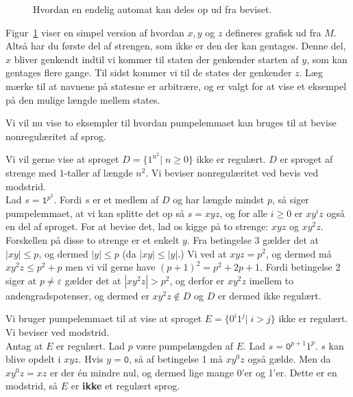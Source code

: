 \begin{figure}[ht]
  \centering
  \caption{\label{fig:pumpelemma} Hvordan en endelig automat kan deles op ud fra beviset.}
\end{figure}


Figur~\ref{fig:pumpelemma} viser en simpel version af hvordan $x, y$ og $z$ defineres grafisk ud fra $M$. Altså har du første del af strengen, som ikke er den der kan gentages. Denne del, $x$ bliver genkendt indtil vi kommer til staten der genkender starten af $y$, som kan gentages flere gange. Til sidst kommer vi til de states der genkender $z$. Læg mærke til at navnene på statesne er arbitrære, og er valgt for at vise et eksempel på den mulige længde mellem states.


Vi vil nu vise to eksempler til hvordan pumpelemmaet kan bruges til at bevise nonregulæritet af sprog.

\begin{example}
  Vi vil gerne vise at sproget $D = \{1^{n^{2}}|\; n \geq 0\}$ ikke er regulært. $D$ er sproget af strenge med $1$-taller af længde $n^{2}$. Vi beviser nonregulæritet ved bevis ved modstrid.\\
  Lad $s = \mathtt{1}^{p^{2}}$. Fordi $s$ er et medlem af $D$ og har længde mindst $p$, så siger pumpelemmaet, at vi kan splitte det op så $s = xyz$, og for alle $i \geq 0$ er $xy^{i}z$ også en del af sproget. For at bevise det, lad os kigge på to strenge: $xyz$ og $xy^{2}z$. Forskellen på disse to strenge er et enkelt $y$. Fra betingelse 3 gælder det at $|xy| \leq p$, og dermed $|y| \leq p$ (da $|xy| \leq |y|$.) Vi ved at $xyz = p^{2}$, og dermed må $xy^{2}z \leq p^{2} + p$ men vi vil gerne have $(p+1)^{2} = p^{2}+2p+1$. Fordi betingelse 2 siger at $p \neq \varepsilon$ gælder det at $|xy^{2}z| > p^{2}$, og derfor er $xy^{2}z$ imellem to andengradspotenser, og dermed er $xy^{2}z \notin D$ og $D$ er dermed ikke regulært.
\end{example}

\begin{example}
  Vi bruger pumpelemmaet til at vise at sproget $E = \{0^{i}1^{j}|\;i>j\}$ ikke er regulært. Vi beviser ved modstrid. \\
  Antag at  $E$ er regulært. Lad $p$ være pumpelængden af $E$. Lad $s = \mathtt{0}^{p+1}1^{p}$. $s$ kan blive opdelt i $xyz$. Hvis $y = \mathtt{0}$, så af betingelse 1 må $xy^{0}z$ også gælde. Men da $xy^{0}z = xz$ er der én mindre nul, og dermed lige mange 0'er og 1'er. Dette er en modstrid, så $E$ er \textbf{ikke} et regulært sprog.

\end{example}

